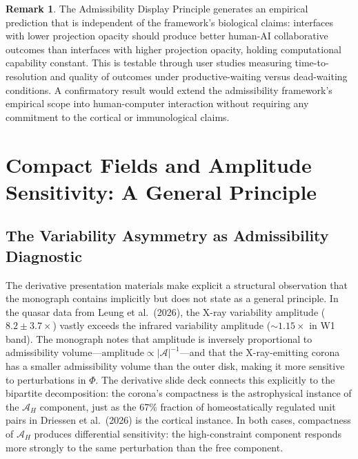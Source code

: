 \documentclass[12pt, a4paper]{article}
\theoremstyle{definition}
\newtheorem{remark}{Remark}[section]
\begin{document}
\begin{remark}
The Admissibility Display Principle generates an empirical prediction that is independent of the framework's biological claims: interfaces with lower projection opacity should produce better human-AI collaborative outcomes than interfaces with higher projection opacity, holding computational capability constant. This is testable through user studies measuring time-to-resolution and quality of outcomes under productive-waiting versus dead-waiting conditions. A confirmatory result would extend the admissibility framework's empirical scope into human-computer interaction without requiring any commitment to the cortical or immunological claims.
\end{remark}

\section{Compact Fields and Amplitude Sensitivity: A General Principle}

\subsection{The Variability Asymmetry as Admissibility Diagnostic}

The derivative presentation materials make explicit a structural observation that the monograph contains implicitly but does not state as a general principle. In the quasar data from Leung et al.\ (2026), the X-ray variability amplitude ($8.2 \pm 3.7 \times$) vastly exceeds the infrared variability amplitude ($\sim 1.15\times$ in W1 band). The monograph notes that amplitude is inversely proportional to admissibility volume---$\mathrm{amplitude} \propto |\mathcal{A}|^{-1}$---and that the X-ray-emitting corona has a smaller admissibility volume than the outer disk, making it more sensitive to perturbations in $\Phi$. The derivative slide deck connects this explicitly to the bipartite decomposition: the corona's compactness is the astrophysical instance of the $\mathcal{A}_H$ component, just as the 67\% fraction of homeostatically regulated unit pairs in Driessen et al.\ (2026) is the cortical instance. In both cases, compactness of $\mathcal{A}_H$ produces differential sensitivity: the high-constraint component responds more strongly to the same perturbation than the free component.
\end{document}
